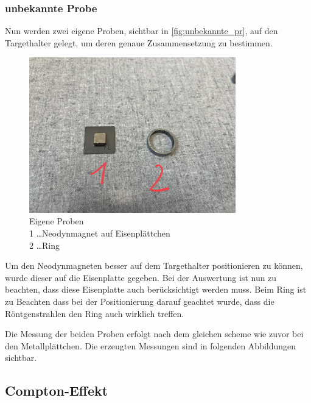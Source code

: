 \documentclass[12pt,english,ngerman]{scrartcl}
\begin{document}

\subsubsection{unbekannte Probe}

Nun werden zwei eigene Proben, sichtbar in \autoref{fig:unbekannte_pr}, auf den Targethalter gelegt, um deren genaue Zusammensetzung zu bestimmen.

\begin{figure}[H]
	\begin{center}
		\includegraphics[width =0.8\textwidth]{./figures/eigene_proben.jpg}
	\end{center}
	\caption[Eigene Proben]
	{Eigene Proben\\
	1 \dots Neodynmagnet auf Eisenplättchen\\
	2 \dots Ring
	}\label{fig:unbekannte_pr}
\end{figure}

Um den Neodynmagneten besser auf dem Targethalter positionieren zu können, wurde dieser auf die Eisenplatte gegeben. Bei der
Auswertung ist nun zu beachten, dass diese Eisenplatte auch berücksichtigt werden muss.
Beim Ring ist zu Beachten dass bei der Positionierung darauf geachtet wurde, dass die Röntgenstrahlen den Ring auch 
wirklich treffen.

Die Messung der beiden Proben erfolgt nach dem gleichen scheme wie zuvor bei den Metallplättchen.
Die erzeugten Messungen sind in folgenden Abbildungen sichtbar.


\subsection{Compton-Effekt}
\end{document}
